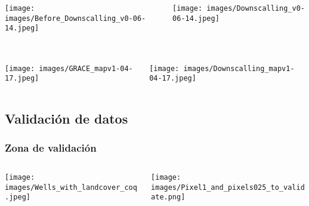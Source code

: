 \documentclass{beamer}
\begin{document}
  \begin{frame}
    \frametitle{}

    \begin{columns}

      \begin{column}{0.5\textwidth}
        \texttt{[image: images/Before\_Downscalling\_v0-06-14.jpeg]}
      \end{column}

      \begin{column}{0.5\textwidth}
        \centering
        \texttt{[image: images/Downscalling\_v0-06-14.jpeg]}
      \end{column}

    \end{columns}
  \end{frame}

  
  \begin{frame}
    \frametitle{}

    \begin{columns}

      \begin{column}{0.5\textwidth}
        \centering
        \texttt{[image: images/GRACE\_mapv1-04-17.jpeg]}
      \end{column}

      \begin{column}{0.5\textwidth}
        \texttt{[image: images/Downscalling\_mapv1-04-17.jpeg]}
      \end{column}

    \end{columns}

  \end{frame}

  \subsection*{Validación de datos}

  \begin{frame}
    \frametitle{Zona de validación}

    \begin{columns}

      \begin{column}{0.5\textwidth}
        \centering
        \texttt{[image: images/Wells\_with\_landcover\_coq.jpeg]}
      \end{column}

      \begin{column}{0.5\textwidth}
        \centering
        \texttt{[image: images/Pixel1\_and\_pixels025\_to\_validate.png]}
      \end{column}

    \end{columns}
  \end{frame}
\end{document}
